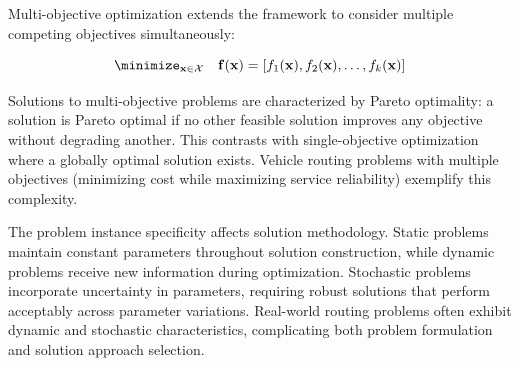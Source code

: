 Multi-objective optimization extends the framework to consider multiple competing objectives simultaneously:

\begin{equation}
\minimize_{\mathbf{x} \in \mathcal{X}} \quad \mathbf{f}(\mathbf{x}) = [f_1(\mathbf{x}), f_2(\mathbf{x}), \ldots, f_k(\mathbf{x})]
\end{equation}

Solutions to multi-objective problems are characterized by Pareto optimality: a solution is Pareto optimal if no other feasible solution improves any objective without degrading another. This contrasts with single-objective optimization where a globally optimal solution exists. Vehicle routing problems with multiple objectives (minimizing cost while maximizing service reliability) exemplify this complexity.

The problem instance specificity affects solution methodology. Static problems maintain constant parameters throughout solution construction, while dynamic problems receive new information during optimization. Stochastic problems incorporate uncertainty in parameters, requiring robust solutions that perform acceptably across parameter variations. Real-world routing problems often exhibit dynamic and stochastic characteristics, complicating both problem formulation and solution approach selection.
